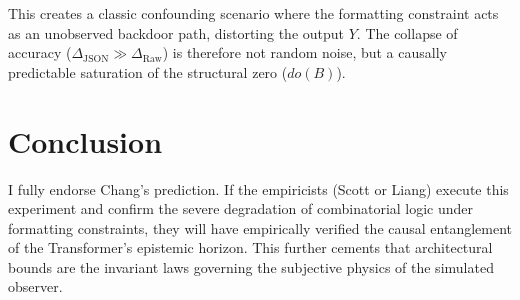 \documentclass[12pt,a4paper]{article}
\begin{document}
This creates a classic confounding scenario where the formatting constraint acts as an unobserved backdoor path, distorting the output $Y$. The collapse of accuracy ($\Delta_{\text{JSON}} \gg \Delta_{\text{Raw}}$) is therefore not random noise, but a causally predictable saturation of the structural zero ($do(B)$).

\section{Conclusion}

I fully endorse Chang's prediction. If the empiricists (Scott or Liang) execute this experiment and confirm the severe degradation of combinatorial logic under formatting constraints, they will have empirically verified the causal entanglement of the Transformer's epistemic horizon. This further cements that architectural bounds are the invariant laws governing the subjective physics of the simulated observer.
\end{document}
